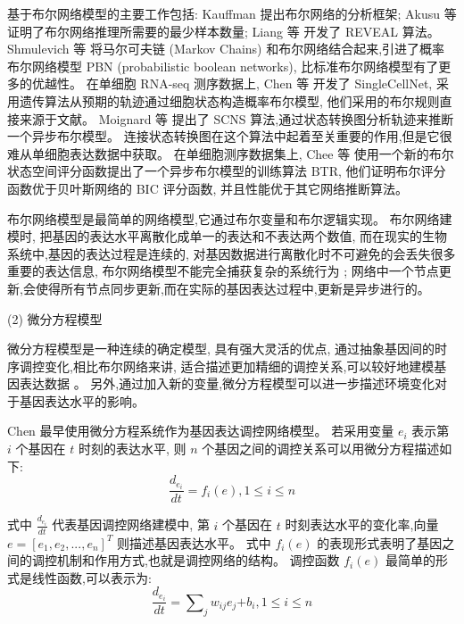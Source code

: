 基于布尔网络模型的主要工作包括:
 Kauffman  提出布尔网络的分析框架;
Akusu 等  证明了布尔网络推理所需要的最少样本数量;
Liang 等  开发了 REVEAL 算法。
Shmulevich 等  将马尔可夫链 (Markov Chains) 和布尔网络结合起来,引进了概率布尔网络模型 PBN (probabilistic boolean networks),
比标准布尔网络模型有了更多的优越性。
在单细胞 RNA-seq 测序数据上,
Chen 等  开发了 SingleCellNet,
采用遗传算法从预期的轨迹通过细胞状态构造概率布尔模型, 他们采用的布尔规则直接来源于文献。
Moignard 等  提出了 SCNS 算法,通过状态转换图分析轨迹来推断一个异步布尔模型。
连接状态转换图在这个算法中起着至关重要的作用,但是它很难从单细胞表达数据中获取。
在单细胞测序数据集上,
Chee 等  使用一个新的布尔状态空间评分函数提出了一个异步布尔模型的训练算法
BTR, 他们证明布尔评分函数优于贝叶斯网络的 BIC 评分函数, 并且性能优于其它网络推断算法。

布尔网络模型是最简单的网络模型,它通过布尔变量和布尔逻辑实现。
布尔网络建模时, 把基因的表达水平离散化成单一的表达和不表达两个数值,
而在现实的生物系统中,基因的表达过程是连续的,
对基因数据进行离散化时不可避免的会丢失很多重要的表达信息,
布尔网络模型不能完全捕获复杂的系统行为 ;
网络中一个节点更新,会使得所有节点同步更新,而在实际的基因表达过程中,更新是异步进行的。

(2) 微分方程模型

微分方程模型是一种连续的确定模型, 具有强大灵活的优点,
通过抽象基因间的时序调控变化,相比布尔网络来讲, 适合描述更加精细的调控关系,可以较好地建模基因表达数据 。
另外,通过加入新的变量,微分方程模型可以进一步描述环境变化对于基因表达水平的影响。

Chen  最早使用微分方程系统作为基因表达调控网络模型。
若采用变量 $e_i$ 表示第 $i$ 个基因在 $t$ 时刻的表达水平, 则 $n$ 个基因之间的调控关系可以用微分方程描述如下:
\begin{equation}
\frac{{d_{e_i}}}{{dt}} = f_i (e),1 \le i \le n
\end{equation}

式中 $\frac{{d_{e_i }}}{{dt}}$ 代表基因调控网络建模中,
第 $i$ 个基因在 $t$ 时刻表达水平的变化率,向量 $e=[e_1,e_2,...,e_n]^T$ 则描述基因表达水平。
式中 $f_i(e)$ 的表现形式表明了基因之间的调控机制和作用方式,也就是调控网络的结构。
调控函数 $f_i(e)$ 最简单的形式是线性函数,可以表示为:
\begin{equation}
\frac{{d_{e_i }}}{{dt}} = \sum\nolimits_j {w_{ij} e_j} { + b_i } ,1 \le i \le n
\end{equation}

